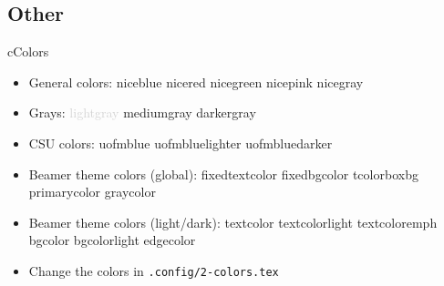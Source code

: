 \subsection*{Other}
\begin{myslide}{c}{Colors}

\begin{itemize}

\item General colors:
\textcolor{niceblue}{niceblue}
\textcolor{nicered}{nicered}
\textcolor{nicegreen}{nicegreen}
\textcolor{nicepink}{nicepink}
\textcolor{nicegray}{nicegray}

\item Grays:
\textcolor{lightgray}{lightgray}
\textcolor{mediumgray}{mediumgray}
\textcolor{darkergray}{darkergray}

\item CSU colors:
\textcolor{uofmblue}{uofmblue}
\textcolor{uofmbluelighter}{uofmbluelighter}
\textcolor{uofmbluedarker}{uofmbluedarker}


\item Beamer theme colors (global):
\textcolor{fixedtextcolor}{fixedtextcolor}
\textcolor{fixedbgcolor}{fixedbgcolor}
\textcolor{tcolorboxbg}{tcolorboxbg}
\textcolor{primarycolor}{primarycolor}
\textcolor{graycolor}{graycolor}

\item Beamer theme colors (light/dark):
\textcolor{textcolor}{textcolor}
\textcolor{textcolorlight}{textcolorlight}
\textcolor{textcoloremph}{textcoloremph}
\textcolor{bgcolor}{bgcolor}
\textcolor{bgcolorlight}{bgcolorlight}
\textcolor{edgecolor}{edgecolor}

\item Change the colors in \lstinline{.config/2-colors.tex}

\end{itemize}

\end{myslide}

